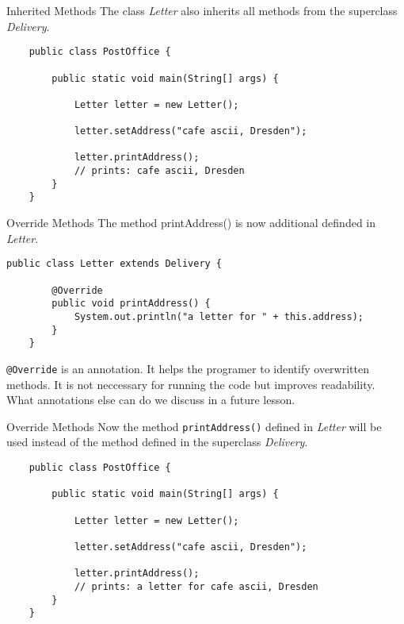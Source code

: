 \begin{frame}[fragile]{Inherited Methods}
	The class \emph{Letter} also inherits all methods from the superclass \emph{Delivery}.
	\begin{lstlisting}
	public class PostOffice {
	
	    public static void main(String[] args) {
	    
	        Letter letter = new Letter();
	        
	        letter.setAddress("cafe ascii, Dresden");
	        
	        letter.printAddress();
	        // prints: cafe ascii, Dresden
	    }	
	}
	\end{lstlisting}
\end{frame}

\begin{frame}[fragile]{Override Methods}
	The method printAddress() is now additional definded in \emph{Letter}.
	\begin{lstlisting}[escapechar=!]
	public class Letter extends Delivery {
	
	    @Override
	    public void printAddress() {
	        System.out.println("a letter for " + this.address);    
	    }	
	}
	\end{lstlisting}
	\texttt{@Override} is an annotation. 
	It helps the programer to identify overwritten methods.
	It is not neccessary for running the code but improves readability.
	What annotations else can do we discuss in a future lesson.
\end{frame}
\begin{frame}[fragile]{Override Methods}
	Now the method \texttt{printAddress()} defined in \emph{Letter} will be used instead of the method defined
	in the superclass \emph{Delivery}.
	\begin{lstlisting}
	public class PostOffice {
	
	    public static void main(String[] args) {
	    
	        Letter letter = new Letter();
	        
	        letter.setAddress("cafe ascii, Dresden");
	        
	        letter.printAddress();
	        // prints: a letter for cafe ascii, Dresden
	    }	
	}
	\end{lstlisting}
\end{frame}

